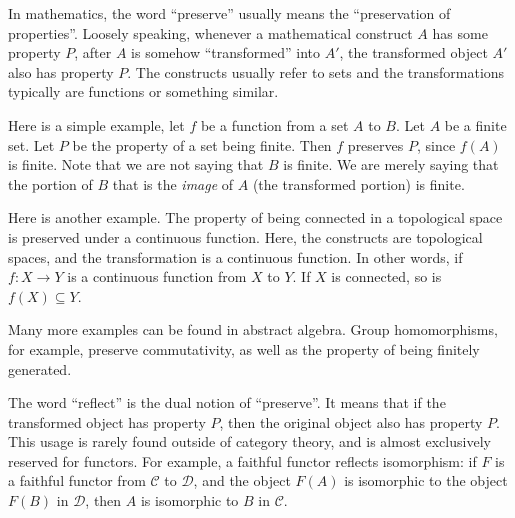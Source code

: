 \documentclass[12pt]{article}
\begin{document}
In mathematics, the word ``preserve'' usually means the ``preservation of properties''.  Loosely speaking, whenever a mathematical construct $A$ has some property $P$, after $A$ is somehow ``transformed'' into $A'$, the transformed object $A'$ also has property $P$.  The constructs usually refer to sets and the transformations typically are functions or something similar.

Here is a simple example, let $f$ be a function from a set $A$ to $B$.  Let $A$ be a finite set.  Let $P$ be the property of a set being finite.  Then $f$ preserves $P$, since $f(A)$ is finite.  Note that we are not saying that $B$ is finite.  We are merely saying that the portion of $B$ that is the \emph{image} of $A$ (the transformed portion) is finite.

Here is another example.  The property of being connected in a topological space is preserved under a continuous function.  Here, the constructs are topological spaces, and the transformation is a continuous function.  In other words, if $f:X\to Y$ is a continuous function from $X$ to $Y$.  If $X$ is connected, so is $f(X)\subseteq Y$.

Many more examples can be found in abstract algebra.  Group homomorphisms, for example, preserve commutativity, as well as the property of being finitely generated.

The word ``reflect'' is the dual notion of ``preserve''.  It means that if the transformed object has property $P$, then the original object also has property $P$.  This usage is rarely found outside of category theory, and is almost exclusively reserved for functors.  For example, a faithful functor reflects isomorphism: if $F$ is a faithful functor from $\mathcal{C}$ to $\mathcal{D}$, and the object $F(A)$ is isomorphic to the object $F(B)$ in $\mathcal{D}$, then $A$ is isomorphic to $B$ in $\mathcal{C}$.
\end{document}
